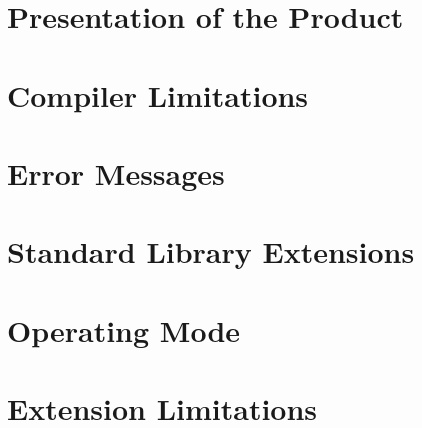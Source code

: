 \section{Presentation of the Product}


\section{Compiler Limitations}


\section{Error Messages}


\section{Standard Library Extensions}
 

\section{Operating Mode}


\section{Extension Limitations}


